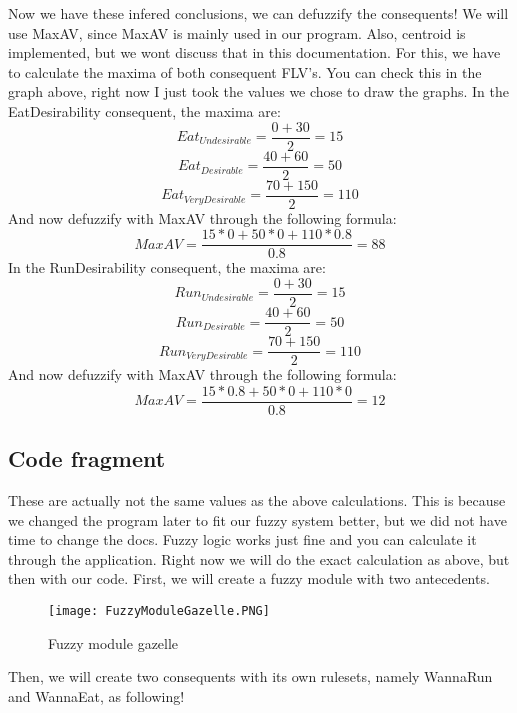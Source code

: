 Now we have these infered conclusions, we can defuzzify the consequents!
We will use MaxAV, since MaxAV is mainly used in our program.
Also, centroid is implemented, but we wont discuss that in this documentation.
For this, we have to calculate the maxima of both consequent FLV's.
You can check this in the graph above, right now I just took the values we chose to draw the graphs.
In the EatDesirability consequent, the maxima are:
\begin{equation}
    Eat_{Undesirable} = \frac{0 + 30}2 = 15
\end{equation}
\begin{equation}
    Eat_{Desirable} = \frac{40 + 60}2 = 50
\end{equation}
\begin{equation}
    Eat_{VeryDesirable} = \frac{70 + 150}2 = 110
\end{equation}
And now defuzzify with MaxAV through the following formula:
\begin{equation}
    MaxAV = \frac{15 * 0 + 50 * 0 + 110 * 0.8}{0.8} = 88
\end{equation}
In the RunDesirability consequent, the maxima are:
\begin{equation}
    Run_{Undesirable} = \frac{0 + 30}2 = 15
\end{equation}
\begin{equation}
    Run_{Desirable} = \frac{40 + 60}2 = 50
\end{equation}
\begin{equation}
    Run_{VeryDesirable} = \frac{70 + 150}2 = 110
\end{equation}
And now defuzzify with MaxAV through the following formula:
\begin{equation}
    MaxAV = \frac{15 * 0.8 + 50 * 0 + 110 * 0}{0.8} = 12
\end{equation}

\newpage
\subsection{Code fragment}
These are actually not the same values as the above calculations.
This is because we changed the program later to fit our fuzzy system better, but we did not have time to change the docs.
Fuzzy logic works just fine and you can calculate it through the application.
Right now we will do the exact calculation as above, but then with our code.
First, we will create a fuzzy module with two antecedents.

\begin{figure}[ht]
    \begin{center}
        \texttt{[image: FuzzyModuleGazelle.PNG]}
    \end{center}
    \caption{Fuzzy module gazelle}
    \label{fig:FuzzyModuleGazelle}
\end{figure}
\newpage
Then, we will create two consequents with its own rulesets, namely WannaRun and WannaEat, as following!

